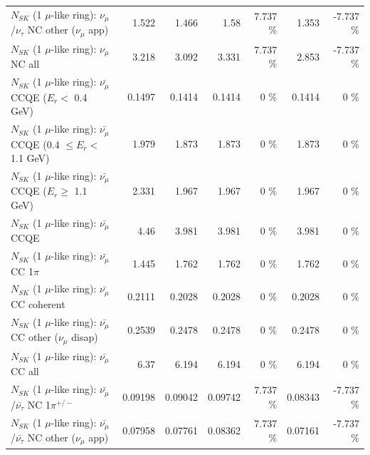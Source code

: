 \begin{table}
\begin{tabular}{| l | r | r | r  r | r  r |}
     $N_{SK}$ (1 $\mu$-like ring): $\nu_\mu$/$\nu_\tau$ NC other ($\nu_\mu$ app) &           1.522 &           1.466 &            1.58 &    7.737 \%  &           1.353 &   -7.737 \%  \\ 
                                $N_{SK}$ (1 $\mu$-like ring): $\nu_{\mu}$ NC all &           3.218 &           3.092 &           3.331 &    7.737 \%  &           2.853 &   -7.737 \%  \\ 
\hline
\hline
\hline
          $N_{SK}$ (1 $\mu$-like ring): $\bar{\nu_\mu}$ CCQE ($E_{r} <$ 0.4 GeV) &          0.1497 &          0.1414 &          0.1414 &        0 \%  &          0.1414 &        0 \%  \\ 
 $N_{SK}$ (1 $\mu$-like ring): $\bar{\nu_\mu}$ CCQE (0.4 $\leq E_{r} <$ 1.1 GeV) &           1.979 &           1.873 &           1.873 &        0 \%  &           1.873 &        0 \%  \\ 
       $N_{SK}$ (1 $\mu$-like ring): $\bar{\nu_\mu}$ CCQE ($E_{r} \geq$ 1.1 GeV) &           2.331 &           1.967 &           1.967 &        0 \%  &           1.967 &        0 \%  \\ 
\hline
                              $N_{SK}$ (1 $\mu$-like ring): $\bar{\nu_\mu}$ CCQE &            4.46 &           3.981 &           3.981 &        0 \%  &           3.981 &        0 \%  \\ 
                         $N_{SK}$ (1 $\mu$-like ring): $\bar{\nu_\mu}$ CC 1$\pi$ &           1.445 &           1.762 &           1.762 &        0 \%  &           1.762 &        0 \%  \\ 
                       $N_{SK}$ (1 $\mu$-like ring): $\bar{\nu_\mu}$ CC coherent &          0.2111 &          0.2028 &          0.2028 &        0 \%  &          0.2028 &        0 \%  \\ 
        $N_{SK}$ (1 $\mu$-like ring): $\bar{\nu_\mu}$ CC other ($\nu_\mu$ disap) &          0.2539 &          0.2478 &          0.2478 &        0 \%  &          0.2478 &        0 \%  \\ 
                          $N_{SK}$ (1 $\mu$-like ring): $\bar{\nu_{\mu}}$ CC all &            6.37 &           6.194 &           6.194 &        0 \%  &           6.194 &        0 \%  \\ 
\hline
  $N_{SK}$ (1 $\mu$-like ring): $\bar{\nu_\mu}$/$\bar{\nu_\tau}$ NC 1$\pi^{+/-}$ &         0.09198 &         0.09042 &         0.09742 &    7.737 \%  &         0.08343 &   -7.737 \%  \\ 
$N_{SK}$ (1 $\mu$-like ring): $\bar{\nu_\mu}$/$\bar{\nu_\tau}$ NC other ($\nu_\mu$ app) &         0.07958 &         0.07761 &         0.08362 &    7.737 \%  &         0.07161 &   -7.737 \%  \\ 

\end{tabular}
\end{table}
